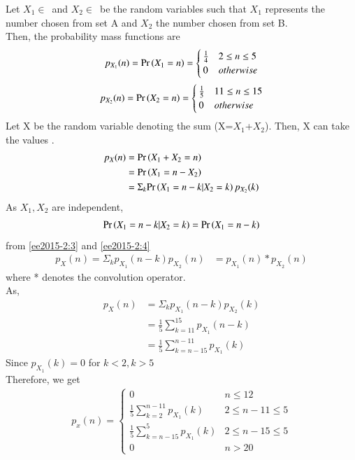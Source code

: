 
Let $X_1\in\,$ and $X_2\in\,$ be the random variables such that $X_1$ represents the number chosen from set A and $X_2$ the number chosen from set B.\\
Then, the probability mass functions are 
\begin{align}
    p_{X_1}(n) = \pr{X_1 = n} = 
    \begin{cases}
    \frac{1}{4} & 2 \leq n \leq 5\\
    0 & otherwise
\end{cases}\label{ee2015-2:1}
\end{align}
\begin{align}
    p_{X_2}(n) = \pr{X_2 = n} = 
    \begin{cases}
    \frac{1}{5} & 11 \leq n \leq 15\\
    0 & otherwise
\end{cases}\label{ee2015-2:2}
\end{align}
Let X be the random variable denoting the sum (X=$X_1$+$X_2$). Then, X can take the values .
\begin{align}
     p_X(n)&=\pr{X_1+X_2=n}\\
     &=\pr{X_1=n-X_2}\\
     &=\Sigma_{k}{\pr{X_1=n-k|X_2=k}p_{X_2}(k)}\label{ee2015-2:3}
\end{align}
 As $X_1,X_2$ are independent,
\begin{align}
    \pr{X_1=n-k|X_2=k}=\pr{X_1=n-k}\label{ee2015-2:4}
\end{align}
from \eqref{ee2015-2:3} and \eqref{ee2015-2:4}
\begin{align}
    p_X(n) = \Sigma_{k} p_{X_1}(n-k)p_{X_2}(n)
    &= p_{X_1}(n)*p_{X_2}(n)\label{ee2015-2:5}
\end{align}
where * denotes the convolution operator.\\
As,
\begin{align}
    p_X(n) &= \Sigma_{k} p_{X_1}(n-k)p_{X_2}(k)\\
    &= \frac{1}{5} \sum_{k=11}^{15}p_{X_1}(n-k)\\
    &= \frac{1}{5} \sum_{k=n-15}^{n-11} p_{X_1}(k)
\end{align}
Since $p_{X_1}(k)=0$ for $k<2 , k>5$\\
Therefore, we get 
\begin{align}
    p_x(n) = 
    \begin{cases}
    0 & n \leq 12\\
    \frac{1}{5} \sum_{k=2}^{n-11}p_{X_1}(k) & 2 \leq n-11 \leq 5\\
    \frac{1}{5} \sum_{k=n-15}^{5}p_{X_1}(k) & 2 \leq n-15 \leq 5\\
    0 & n>20
    \end{cases}
\end{align}
